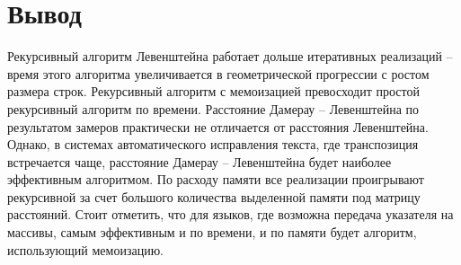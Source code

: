\section{Вывод}
Рекурсивный алгоритм Левенштейна работает дольше итеративных реализаций -- время этого алгоритма увеличивается в геометрической прогрессии с ростом размера строк.
Рекурсивный алгоритм с мемоизацией превосходит простой рекурсивный алгоритм по времени. 
Расстояние Дамерау -- Левенштейна по результатом замеров практически не отличается от расстояния Левенштейна. Однако, в системах автоматического исправления текста, где транспозиция встречается чаще, расстояние Дамерау -- Левенштейна будет наиболее эффективным алгоритмом. 
По расходу памяти все реализации проигрывают рекурсивной за счет большого количества выделенной памяти под матрицу расстояний.
Стоит отметить, что для языков, где возможна передача указателя на массивы, самым эффективным и по времени, и по памяти будет алгоритм, использующий мемоизацию.